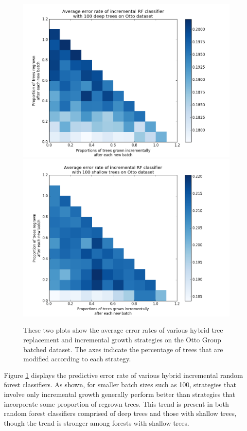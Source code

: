 \begin{figure}
  \centering
  \includegraphics[width=5.0in]{otto_deep_med}\\
  \includegraphics[width=5.0in]{otto_shallow_med}
  \caption{These two plots show the average error rates of various hybrid tree
  replacement and incremental growth strategies on the Otto Group batched
dataset. The axes indicate the percentage of trees that are modified according
to each strategy.}
  \label{fig:ottohybrid}
\end{figure}

Figure \ref{fig:ottohybrid} displays the predictive error rate of various
hybrid incremental random forest classifiers. As shown, for smaller batch sizes
such as 100, strategies that involve only incremental growth generally perform
better than strategies that incorporate some proportion of regrown trees. This
trend is present in both random forest classifiers comprised of deep trees and
those with shallow trees, though the trend is stronger among forests with
shallow trees. 

